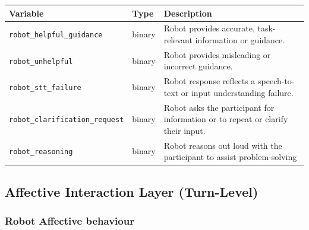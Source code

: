 \documentclass[
]{article}
\newcounter{none} %
\begin{document}
{\def\LTcaptype{none} %
\begin{longtable}[]{@{}
  >{\raggedright\arraybackslash}p{}
  >{\raggedright\arraybackslash}p{}
  >{\raggedright\arraybackslash}p{}@{}}
\toprule\noalign{}
\begin{minipage}[b]{\linewidth}\raggedright
Variable
\end{minipage} & \begin{minipage}[b]{\linewidth}\raggedright
Type
\end{minipage} & \begin{minipage}[b]{\linewidth}\raggedright
Description
\end{minipage} \\
\midrule\noalign{}
\endhead
\bottomrule\noalign{}
\endlastfoot
\texttt{robot\_helpful\_guidance} & binary & Robot provides accurate,
task-relevant information or guidance. \\
\texttt{robot\_unhelpful} & binary & Robot provides misleading or
incorrect guidance. \\
\texttt{robot\_stt\_failure} & binary & Robot response reflects a
speech-to-text or input understanding failure. \\
\texttt{robot\_clarification\_request} & binary & Robot asks the
participant for information or to repeat or clarify their input. \\
\texttt{robot\_reasoning} & binary & Robot reasons out loud with the
participant to assist problem-solving \\
\end{longtable}
}

\subsection{Affective Interaction Layer
(Turn-Level)}\label{affective-interaction-layer-turn-level}

\subsubsection*{Robot Affective
behaviour}\label{robot-affective-behaviour}
\end{document}
